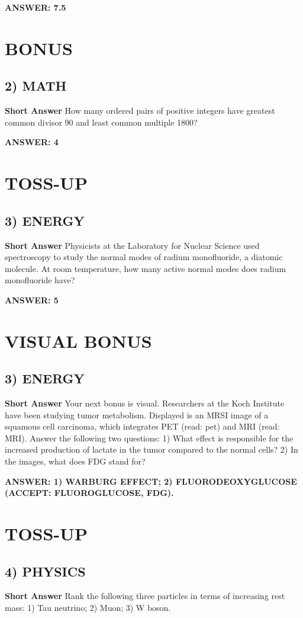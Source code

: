 \documentclass{article}
\begin{document}
\textbf{ANSWER: 7.5}

\section*{BONUS}
\subsection*{2) MATH}
\textbf{Short Answer} How many ordered pairs of positive integers have greatest common divisor 90 and least common multiple 1800?

\textbf{ANSWER: 4}

\section*{TOSS-UP}
\subsection*{3) ENERGY}
\textbf{Short Answer} Physicists at the Laboratory for Nuclear Science used spectroscopy to study the normal modes of radium monofluoride, a diatomic molecule.
At room temperature, how many active normal modes does radium monofluoride have?

\textbf{ANSWER: 5}

\section*{VISUAL BONUS}
\subsection*{3) ENERGY}
\textbf{Short Answer} Your next bonus is visual. Researchers at the Koch Institute have been studying tumor metabolism.
Displayed is an MRSI image of a squamous cell carcinoma, which integrates PET (read: pet) and MRI (read: MRI).
Answer the following two questions:
1) What effect is responsible for the increased production of lactate in the tumor compared to the normal cells?
2) In the images, what does FDG stand for?

\textbf{ANSWER: 1) WARBURG EFFECT; 2) FLUORODEOXYGLUCOSE (ACCEPT: FLUOROGLUCOSE, FDG).}

\section*{TOSS-UP}
\subsection*{4) PHYSICS}
\textbf{Short Answer} Rank the following three particles in terms of increasing rest mass: 1) Tau neutrino; 2) Muon; 3) W boson.
\end{document}
